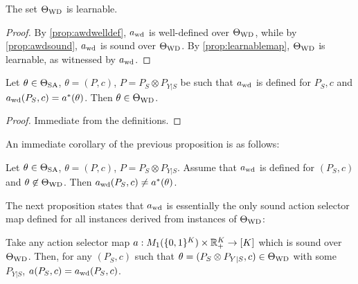 \begin{cor}\label{cor:twdlearnable}
The set $\Theta_{\mathrm{WD}}$ is learnable.
\end{cor}
\begin{proof}
By \cref{prop:awdwelldef}, $a_{\mathrm{wd}}$ is well-defined over $\Theta_{\mathrm{WD}}$, while by \cref{prop:awdsound}, $a_{\mathrm{wd}}$ is sound over $\Theta_{\mathrm{WD}}$.
By \cref{prop:learnablemap}, $\Theta_{\mathrm{WD}}$ is learnable, as witnessed by $a_{\mathrm{wd}}$. 
\end{proof}
\begin{prop}
\label{prop:awdcorrectimplieswd}
Let $\theta \in \Theta_{\mathrm{SA}}$, $\theta = (P,c)$, $P = P_S\otimes P_{Y|S}$ be such that $a_{\mathrm{wd}}$ is defined for $P_S,c$
and $a_{\mathrm{wd}}(P_S,c) = a^*(\theta)$. Then $\theta \in \Theta_{\mathrm{WD}}$.
\end{prop}
\begin{proof}
Immediate from the definitions.
\end{proof}
An immediate corollary of the previous proposition is as follows:
\begin{cor}\label{cor:awdoutsideincorrect}
Let $\theta \in \Theta_{\mathrm{SA}}$, $\theta = (P,c)$, $P = P_S \otimes P_{Y|S}$. 
Assume that $a_{\mathrm{wd}}$ is defined for $(P_S,c)$ and $\theta \not\in \Theta_{\mathrm{WD}}$. Then $a_{\mathrm{wd}}(P_S,c) \ne a^*(\theta)$.
\end{cor}
The next proposition states that $a_{\mathrm{wd}}$ is essentially the only sound action selector map defined for
 all instances derived from instances of $\Theta_{\mathrm{WD}}$:
\begin{prop}\label{prop:awdunique}
Take any action selector map $a: M_1( \{0,1\}^K ) \times \mathbb{R}_+^K \to [K]$ which is sound over $\Theta_{\mathrm{WD}}$.
Then, for any $(P_S,c)$ such that $\theta = (P_S\otimes P_{Y|S},c)\in \Theta_{\mathrm{WD}}$ with some $P_{Y|S}$,
 $a(P_S,c) = a_{\mathrm{wd}}(P_S,c)$.
\end{prop}

